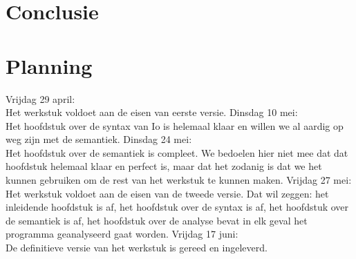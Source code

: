 \documentclass[12pt]{article}
\begin{document}
\section{Conclusie}

\appendix
\section{Planning}
Vrijdag 29 april: \\Het werkstuk voldoet aan de eisen van eerste versie.\newline\newline %
Dinsdag 10 mei: \\Het hoofdstuk over de syntax van Io is helemaal klaar en willen we al aardig op weg zijn met de semantiek.\newline\newline
Dinsdag 24 mei: \\Het hoofdstuk over de semantiek is compleet. We bedoelen hier niet mee dat dat hoofdstuk helemaal klaar en perfect is, maar
dat het zodanig is dat we het kunnen gebruiken om de rest van het werkstuk te kunnen maken.\newline\newline
Vrijdag 27 mei: \\Het werkstuk voldoet aan de eisen van de tweede versie. Dat wil zeggen: het inleidende hoofdstuk is af, het hoofdstuk over de syntax is af, het hoofdstuk over de semantiek is af, het hoofdstuk over de analyse bevat in elk geval het programma geanalyseerd gaat worden.\newline\newline
Vrijdag 17 juni: \\De definitieve versie van het werkstuk is gereed en ingeleverd.
\end{document}
